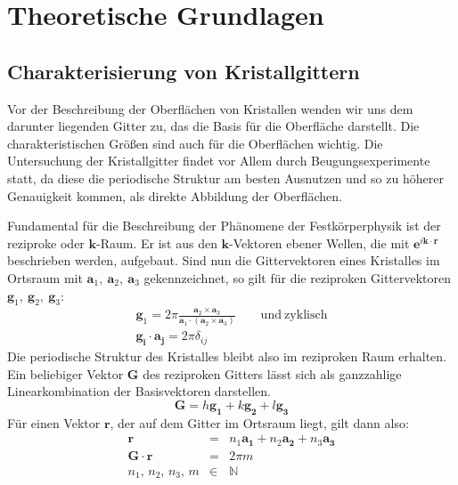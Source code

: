 \section{Theoretische Grundlagen}

\newcommand{\VG}{V_{\mathbf{G}}}
\newcommand{\G}{\mathbf{G}}
\newcommand{\g}{\mathbf{g}}
\newcommand{\R}{\mathbf{r}}
\newcommand{\K}{\mathbf{k}}
\newcommand{\A}{\mathbf{a}}
\newcommand{\ex}{\mathbf{e}^}

\subsection{Charakterisierung von Kristallgittern}
Vor der Beschreibung der Oberflächen von Kristallen wenden wir uns dem darunter liegenden 
Gitter zu, das die Basis für die Oberfläche darstellt. Die charakteristischen Größen 
sind auch für die Oberflächen wichtig. Die Untersuchung der Kristallgitter findet vor 
Allem durch Beugungsexperimente statt, da diese die periodische Struktur am besten 
Ausnutzen und so zu höherer Genauigkeit kommen, als direkte Abbildung der Oberflächen. 

Fundamental für die Beschreibung der Phänomene der Festkörperphysik ist der reziproke 
oder $\K$-Raum. Er ist aus den $\K$-Vektoren ebener Wellen, die mit 
$\ex{i \K \cdot \R}$ beschrieben werden, aufgebaut. Sind nun 
die Gittervektoren eines Kristalles im Ortsraum mit $\A_1,\ \A_2,\ \A_3$ gekennzeichnet, 
so gilt für die reziproken Gittervektoren $\g_1,\ \g_2,\ \g_3$:
\begin{eqnarray}
    \g_1 = 2 \pi \frac{\A_2 \times \A_3 }
        {\A_1\cdot (\A_2 \times \A_3)} \qquad \mathrm{und \ zyklisch} \\
    \mathbf{g_i} \cdot \mathbf{a_j} = 2 \pi \delta_{ij}
\end{eqnarray}
Die periodische Struktur des Kristalles bleibt also im reziproken Raum erhalten.
Ein beliebiger Vektor $\G$ des reziproken Gitters lässt sich als ganzzahlige Linearkombination 
der Basisvektoren darstellen.
\begin{equation}
    \mathbf{G} = h \mathbf{g_1} + k \mathbf{g_2} + l \mathbf{g_3}
\end{equation}
Für einen Vektor $\R$, der auf dem Gitter im Ortsraum liegt, gilt dann also:
\begin{eqnarray}
    \mathbf{r} &=& n_1 \mathbf{a_1} + n_2 \mathbf{a_2} + n_3 \mathbf{a_3} \\
    \mathbf{G} \cdot \mathbf{r}&=& 2 \pi m  \\
    n_1, \, n_2, \, n_3, \, m &\in& \mathbb{N}
\end{eqnarray}

